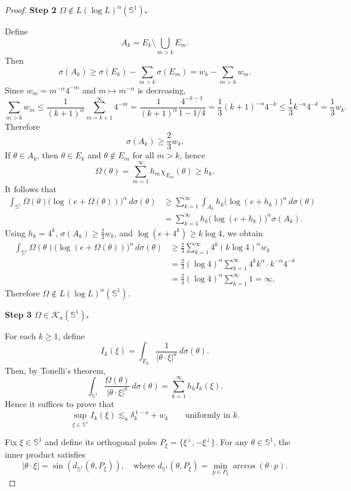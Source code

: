 \documentclass[10pt,a4paper]{amsart}
\begin{document}
\begin{proof}
	\medskip
	\noindent\textbf{Step 2 \(\Omega\notin L(\log L)^\alpha(\mathbb{S}^1)\).}
	
	Define
	\[
	A_k=E_k\setminus \bigcup_{m>k}E_m.
	\]
	Then
	\[
	\sigma(A_k)\ge \sigma(E_k)-\sum_{m>k}\sigma(E_m)
	=w_k-\sum_{m>k}w_m.
	\]
	Since $w_m=m^{-\alpha}4^{-m}$ and $m\mapsto m^{-\alpha}$ is decreasing,
	\[
	\sum_{m>k}w_m
	\le \frac{1}{(k+1)^\alpha}\sum_{m=k+1}^\infty 4^{-m}
	=\frac{1}{(k+1)^\alpha}\frac{4^{-k-1}}{1-1/4}
	=\frac{1}{3}(k+1)^{-\alpha}4^{-k}
	\le \frac{1}{3}k^{-\alpha}4^{-k}
	=\frac{1}{3}w_k.
	\]
	Therefore
	\[
	\sigma(A_k)\ge \frac{2}{3}w_k.
	\]
	If $\theta\in A_k$, then $\theta\in E_k$ and $\theta\notin E_m$ for all $m>k$, hence
	\[
	\Omega(\theta)=\sum_{m=1}^\infty h_m\chi_{E_m}(\theta)\ge h_k.
	\]
	It follows that
	\begin{align*}
		\int_{\mathbb{S}^1}\Omega(\theta)\bigl(\log(e+\Omega(\theta))\bigr)^\alpha\,d\sigma(\theta)
		&\ge \sum_{k=1}^\infty
		\int_{A_k} h_k\bigl(\log(e+h_k)\bigr)^\alpha\,d\sigma(\theta) \\
		&= \sum_{k=1}^\infty h_k\bigl(\log(e+h_k)\bigr)^\alpha \sigma(A_k).
	\end{align*}
	Using $h_k=4^k$, $\sigma(A_k)\ge \frac23 w_k$, and
	$\log(e+4^k)\ge k\log 4$, we obtain
	\begin{align*}
		\int_{\mathbb{S}^1}\Omega(\theta)\bigl(\log(e+\Omega(\theta))\bigr)^\alpha\,d\sigma(\theta)
		&\ge \frac{2}{3}\sum_{k=1}^\infty
		4^k (k\log 4)^\alpha w_k \\
		&= \frac{2}{3}(\log 4)^\alpha
		\sum_{k=1}^\infty 4^k k^\alpha \cdot k^{-\alpha}4^{-k} \\
		&= \frac{2}{3}(\log 4)^\alpha \sum_{k=1}^\infty 1
		= \infty.
	\end{align*}
	Therefore $\Omega\notin L(\log L)^\alpha(\mathbb{S}^1)$.
	
	\medskip
	\noindent\textbf{Step 3 \(\Omega\in \mathcal K_a(\mathbb{S}^1)\).}
	
	For each $k\ge 1$, define
	$$ I_k(\xi) = \int_{E_k} \frac{1}{|\theta \cdot \xi|^a} \, d\sigma(\theta). $$
	Then, by Tonelli's theorem,
	$$ \int_{\mathbb{S}^1} \frac{\Omega(\theta)}{|\theta \cdot \xi|^a} \, d\sigma(\theta) = \sum_{k=1}^\infty h_k I_k(\xi). $$
	Hence it suffices to prove that
	$$ \sup_{\xi\in\mathbb{S}^1} I_k(\xi) \lesssim_a \delta_k^{\,1-a} + w_k \qquad \text{uniformly in } k. $$
	
	Fix $\xi \in \mathbb{S}^1$ and define its orthogonal poles $P_\xi = \{\xi^\perp, -\xi^\perp\}$. For any $\theta \in \mathbb{S}^1$, the inner product satisfies
	$$ |\theta \cdot \xi| = \sin(d_{\mathbb{S}^1}(\theta, P_\xi)), \quad \text{where } d_{\mathbb{S}^1}(\theta, P_\xi) = \min_{p \in P_\xi} \arccos(\theta \cdot p). $$
	

\end{proof}
\end{document}
